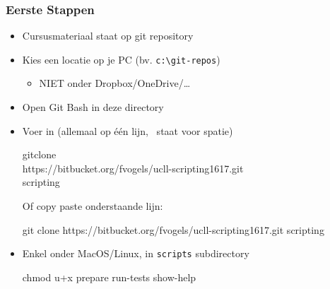 \begin{frame}
  \frametitle{Eerste Stappen}
  \begin{itemize}
    \item Cursusmateriaal staat op git repository
    \item Kies een locatie op je PC (bv. \texttt{c:\textbackslash git-repos})
          \begin{itemize}
            \item NIET onder Dropbox/OneDrive/\dots
          \end{itemize}
    \item Open Git Bash in deze directory
    \item Voer in (allemaal op \'e\'en lijn, \textvisiblespace\ staat voor spatie)
          \begin{center} \ttfamily\small
            git\textvisiblespace clone\textvisiblespace \\
            https://bitbucket.org/fvogels/ucll-scripting1617.git\textvisiblespace \\
            scripting
          \end{center}
          Of copy paste onderstaande lijn:
          \begin{center} \ttfamily\tiny
            git clone https://bitbucket.org/fvogels/ucll-scripting1617.git scripting
          \end{center}
    \item Enkel onder MacOS/Linux, in \texttt{scripts} subdirectory
          \begin{center} \ttfamily
            chmod u+x prepare run-tests show-help
          \end{center}
  \end{itemize}
\end{frame}

